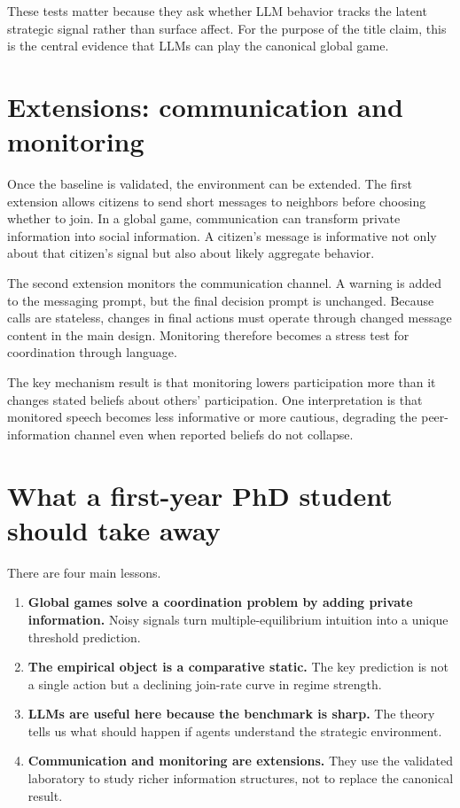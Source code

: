 \documentclass[11pt]{article}
\begin{document}
These tests matter because they ask whether LLM behavior tracks the latent strategic signal rather than surface affect. For the purpose of the title claim, this is the central evidence that LLMs can play the canonical global game.

\section{Extensions: communication and monitoring}

Once the baseline is validated, the environment can be extended. The first extension allows citizens to send short messages to neighbors before choosing whether to join. In a global game, communication can transform private information into social information. A citizen's message is informative not only about that citizen's signal but also about likely aggregate behavior.

The second extension monitors the communication channel. A warning is added to the messaging prompt, but the final decision prompt is unchanged. Because calls are stateless, changes in final actions must operate through changed message content in the main design. Monitoring therefore becomes a stress test for coordination through language.

The key mechanism result is that monitoring lowers participation more than it changes stated beliefs about others' participation. One interpretation is that monitored speech becomes less informative or more cautious, degrading the peer-information channel even when reported beliefs do not collapse.

\section{What a first-year PhD student should take away}

There are four main lessons.

\begin{enumerate}
  \item \textbf{Global games solve a coordination problem by adding private information.} Noisy signals turn multiple-equilibrium intuition into a unique threshold prediction.
  \item \textbf{The empirical object is a comparative static.} The key prediction is not a single action but a declining join-rate curve in regime strength.
  \item \textbf{LLMs are useful here because the benchmark is sharp.} The theory tells us what should happen if agents understand the strategic environment.
  \item \textbf{Communication and monitoring are extensions.} They use the validated laboratory to study richer information structures, not to replace the canonical result.
\end{enumerate}
\end{document}
